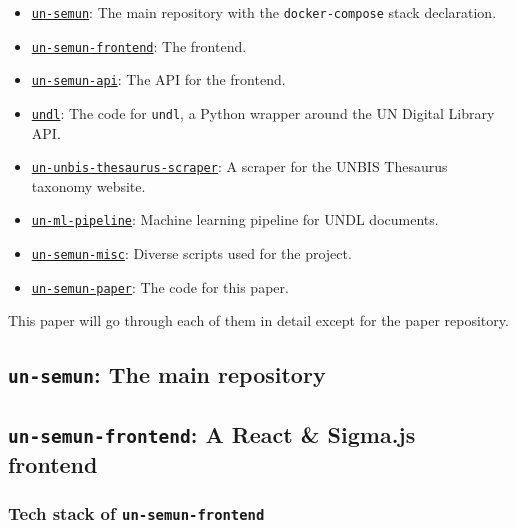 \documentclass[11pt]{article}
\begin{document}
\begin{itemize}
    \item \href{https://github.com/ClementSicard/un-semun}{\faGithub{} \texttt{un-semun}}: The main repository with the \texttt{docker-compose} stack declaration.
    \item \href{https://github.com/ClementSicard/un-semun-frontend}{\faGithub{} \texttt{un-semun-frontend}}: The frontend.
    \item \href{https://github.com/ClementSicard/un-semun-api}{\faGithub{} \texttt{un-semun-api}}: The API for the frontend.
    \item \href{https://github.com/ClementSicard/undl}{\faGithub{} \texttt{undl}}: The code for \texttt{undl}, a Python wrapper around the UN Digital Library API.
    \item \href{https://github.com/ClementSicard/un-unbis-thesaurus-scraper}{\faGithub{} \texttt{un-unbis-thesaurus-scraper}}: A scraper for the UNBIS Thesaurus taxonomy website.
    \item \href{https://github.com/ClementSicard/un-ml-pipeline}{\faGithub{} \texttt{un-ml-pipeline}}: Machine learning pipeline for UNDL documents.
    \item \href{https://github.com/ClementSicard/un-semun-misc}{\faGithub{} \texttt{un-semun-misc}}: Diverse scripts used for the project.
    \item \href{https://github.com/ClementSicard/un-semun-paper}{\faGithub{} \texttt{un-semun-paper}}: The code for this paper.
\end{itemize}

This paper will go through each of them in detail except for the paper repository.

\subsection{\texttt{un-semun}: The main repository} \label{ssec:un-semun-the-main-repository}


\subsection{\texttt{un-semun-frontend}: A React \& Sigma.js frontend} \label{ssec:un-semun-frontend-a-react-sigma-js-frontend}
\subsubsection*{Tech stack of \texttt{un-semun-frontend}} \label{sssec:tech-stack-of-un-semun-frontend}
\end{document}
